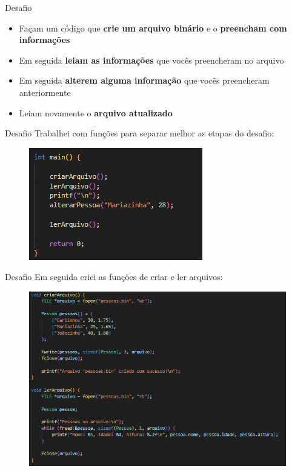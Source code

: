 \begin{frame}{Desafio}
\begin{itemize}
    \item Façam um código que \textbf{crie um arquivo binário} e o \textbf{preencham com informações}
    \item Em seguida \textbf{leiam as informações} que vocês preencheram no arquivo
    \item Em seguida \textbf{alterem alguma informação} que vocês preencheram anteriormente
    \item Leiam novamente o \textbf{arquivo atualizado}
\end{itemize}
\end{frame}

\begin{frame}{Desafio}
Trabalhei com funções para separar melhor as etapas do desafio:
\begin{figure}
    \centering
    \includegraphics[width=0.5\linewidth]{figuras/Codbin1.png}
\end{figure}
\end{frame}

\begin{frame}{Desafio}
Em seguida criei as funções de criar e ler arquivos:
\begin{figure}
    \centering
    \includegraphics[width=0.75\linewidth]{figuras/Codbin2.png}
\end{figure}
\end{frame}

